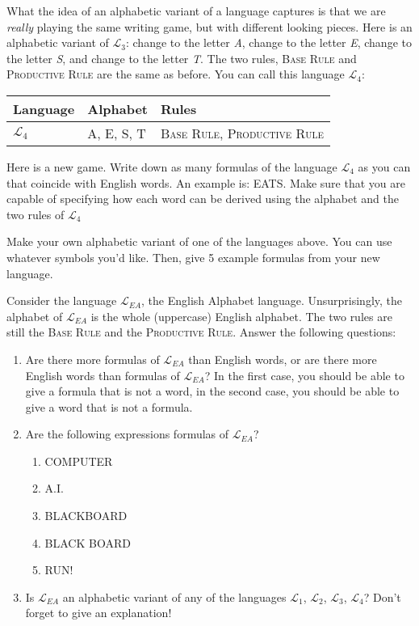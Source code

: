 What the idea of an alphabetic variant of a language captures is that we are \textit{really} playing the same writing game, but with different looking pieces. Here is an alphabetic variant of $\mathcal{L}_3$: change \bcirc{} to the letter \textit{A}, change \bbox{} to the letter \textit{E}, change \btri{} to the letter \textit{S}, and change \bstar{} to the letter \textit{T}. The two rules, \textsc{Base Rule} and \textsc{Productive Rule} are the same as before. You can call this language $\mathcal{L}_4$:

\begin{center}
	\begin{tabular}{lll}
		\textbf{Language} & \textbf{Alphabet} & \textbf{Rules} \\\hline
		$\mathcal{L}_4$ & A, E, S, T & \textsc{Base Rule}, \textsc{Productive Rule}
	\end{tabular}
\end{center}

\begin{exc}
Here is a new game. Write down as many formulas of the language $\mathcal{L}_4$ as you can that coincide with English words. An example is: EATS. Make sure that you are capable of specifying how each word can be derived using the alphabet and the two rules of $\mathcal{L}_4$
\end{exc}

\begin{exc}
Make your own alphabetic variant of one of the languages above. You can use whatever symbols you'd like. Then, give 5 example formulas from your new language. 
\end{exc}

\begin{exc}
Consider the language $\mathcal{L}_{EA}$, the English Alphabet language. Unsurprisingly, the alphabet of $\mathcal{L}_{EA}$ is the whole (uppercase) English alphabet. The two rules are still the \textsc{Base Rule} and the \textsc{Productive Rule}. Answer the following questions:

\begin{enumerate}
	\item Are there more formulas of $\mathcal{L}_{EA}$ than English words, or are there more English words than formulas of $\mathcal{L}_{EA}$? In the first case, you should be able to give a formula that is not a word, in the second case, you should be able to give a word that is not a formula. 
	\item Are the following expressions formulas of $\mathcal{L}_{EA}$?
		\begin{enumerate}
			\item COMPUTER
			\item A.I.
			\item BLACKBOARD
			\item BLACK BOARD
			\item RUN!
		\end{enumerate}
	\item Is $\mathcal{L}_{EA}$ an alphabetic variant of any of the languages $\mathcal{L}_1$, $\mathcal{L}_2$, $\mathcal{L}_3$, $\mathcal{L}_4$? Don't forget to give an explanation!
\end{enumerate}
\end{exc}

